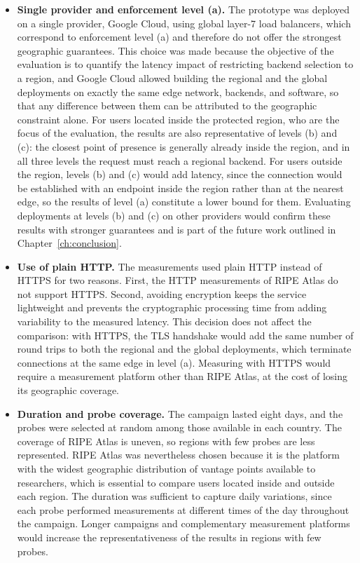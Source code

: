 \documentclass[
A4paper,                %
twoside,                %
openright,              %
chapterprefix=true,     %
12pt,                   %
headings=normal,        %
titlepage=on            %
]{book}
\begin{document}
\begin{itemize}
    \item \textbf{Single provider and enforcement level (a).} The prototype was deployed on a single provider, Google Cloud, using global layer-7 load balancers, which correspond to enforcement level (a) and therefore do not offer the strongest geographic guarantees. This choice was made because the objective of the evaluation is to quantify the latency impact of restricting backend selection to a region, and Google Cloud allowed building the regional and the global deployments on exactly the same edge network, backends, and software, so that any difference between them can be attributed to the geographic constraint alone. For users located inside the protected region, who are the focus of the evaluation, the results are also representative of levels (b) and (c): the closest point of presence is generally already inside the region, and in all three levels the request must reach a regional backend. For users outside the region, levels (b) and (c) would add latency, since the connection would be established with an endpoint inside the region rather than at the nearest edge, so the results of level (a) constitute a lower bound for them. Evaluating deployments at levels (b) and (c) on other providers would confirm these results with stronger guarantees and is part of the future work outlined in Chapter~\ref{ch:conclusion}.

    \item \textbf{Use of plain HTTP.} The measurements used plain HTTP instead of HTTPS for two reasons. First, the HTTP measurements of RIPE Atlas do not support HTTPS. Second, avoiding encryption keeps the service lightweight and prevents the cryptographic processing time from adding variability to the measured latency. This decision does not affect the comparison: with HTTPS, the TLS handshake would add the same number of round trips to both the regional and the global deployments, which terminate connections at the same edge in level (a). Measuring with HTTPS would require a measurement platform other than RIPE Atlas, at the cost of losing its geographic coverage.

    \item \textbf{Duration and probe coverage.} The campaign lasted eight days, and the probes were selected at random among those available in each country. The coverage of RIPE Atlas is uneven, so regions with few probes are less represented. RIPE Atlas was nevertheless chosen because it is the platform with the widest geographic distribution of vantage points available to researchers, which is essential to compare users located inside and outside each region. The duration was sufficient to capture daily variations, since each probe performed measurements at different times of the day throughout the campaign. Longer campaigns and complementary measurement platforms would increase the representativeness of the results in regions with few probes.


\end{itemize}
\end{document}

